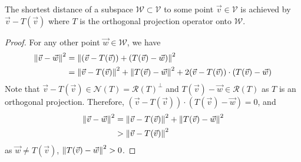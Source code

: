 \begin{proper}
The shortest distance of a subspace $\mathcal{W} \subset \mathcal{V}$ to some point $\vec{v} \in \mathcal{V}$ is achieved by $\vec{v} - T(\vec{v})$ where $T$ is the orthogonal projection operator onto $\mathcal{W}$.
\end{proper}
\begin{proof}
For any other point $\vec{w} \in \mathcal{W}$, we have
\begin{align*}
\norm{\vec{v} - \vec{w}}^2 &= \norm{(\vec{v} - T(\vec{v})) + (T(\vec{v}) - \vec{w})}^2 \\
&= \norm{\vec{v} - T(\vec{v})}^2 + \norm{T(\vec{v}) - \vec{w}}^2 + 2 (\vec{v} - T(\vec{v})) \cdot (T(\vec{v}) - \vec{w})
\end{align*}
Note that $\vec{v} - T(\vec{v}) \in \mathcal{N}(T) = \mathcal{R}(T)^\perp$ and $T(\vec{v}) - \vec{w} \in \mathcal{R}(T)$ as $T$ is an orthogonal projection. Therefore, $(\vec{v} - T(\vec{v})) \cdot (T(\vec{v}) - \vec{w}) = 0$, and 
\begin{align*}
\norm{\vec{v} - \vec{w}}^2 &= \norm{\vec{v} - T(\vec{v})}^2 + \norm{T(\vec{v}) - \vec{w}}^2 \\
& > \norm{\vec{v} - T(\vec{v})}^2
\end{align*}
as $\vec{w} \neq T(\vec{v})$, $\norm{T(\vec{v}) - \vec{w}}^2 > 0$.
\end{proof}
